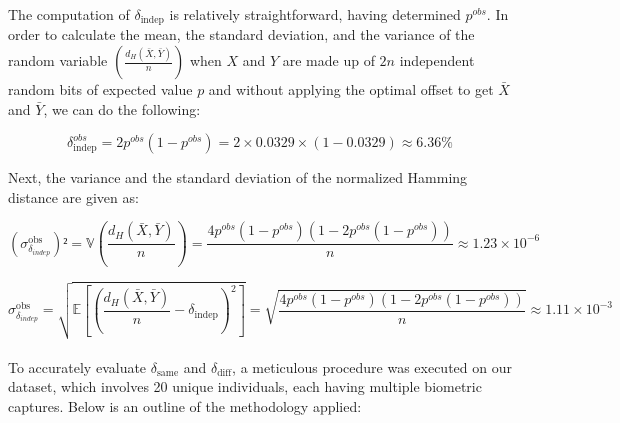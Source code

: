 The computation of \( \delta_{\text{indep}} \) is relatively straightforward, having determined \( p^{obs} \). In order to calculate the mean, the standard deviation, and the variance of the random variable \(\left( \frac{d_H(\bar{X}, \bar{Y})}{n} \right)\) when \(X\) and \(Y\) are made up of \(2n\) independent random bits of expected value \(p\) and without applying the optimal offset to get \(\bar{X}\) and \(\bar{Y}\), we can do the following:

\[ \delta^{obs}_{\text{indep}} = 2p^{obs}(1 - p^{obs}) = 2 \times 0.0329 \times (1 - 0.0329) \approx 6.36\% \]

Next, the variance and the standard deviation of the normalized Hamming distance are given as:


\[ ({\sigma^{\text{obs}}_{\delta_{indep}}})² = \mathbb{V}\left( \frac{d_H(\bar{X}, \bar{Y})}{n} \right) = \frac{4p^{obs}(1 - p^{obs})(1 - 2p^{obs}(1 - p^{obs}))}{n} \approx 1.23 \times 10^{-6} \]

\[ {\sigma^{\text{obs}}_{\delta_{indep}}} = \sqrt{\mathbb{E} \left[ \left( \frac{d_H(\bar{X}, \bar{Y})}{n} - \delta_{\text{indep}} \right)^2 \right]} = \sqrt{\frac{4p^{obs}(1 - p^{obs})(1 - 2p^{obs}(1 - p^{obs}))}{n}} \approx 1.11 \times 10^{-3} \]\\

To accurately evaluate \( \delta_{\text{same}} \) and \( \delta_{\text{diff}} \), a meticulous procedure was executed on our dataset, which involves 20 unique individuals, each having multiple biometric captures. Below is an outline of the methodology applied:

